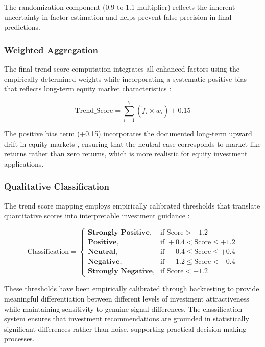 \documentclass[3p,times,procedia]{elsarticle}
\begin{document}
The randomization component (0.9 to 1.1 multiplier) reflects the inherent uncertainty in factor estimation and helps prevent false precision in final predictions.

\subsubsection{{Weighted Aggregation}}

The final trend score computation integrates all enhanced factors using the empirically determined weights while incorporating a systematic positive bias that reflects long-term equity market characteristics \cite{Fama1965}:

\begin{equation}
\text{Trend\_Score} = \sum_{i=1}^{7} \left(\tilde{f}_i \times w_i\right) + 0.15
\end{equation}

The positive bias term (+0.15) incorporates the documented long-term upward drift in equity markets \cite{Fama1965}, ensuring that the neutral case corresponds to market-like returns rather than zero returns, which is more realistic for equity investment applications.

\subsubsection{{Qualitative Classification}}

The trend score mapping employs empirically calibrated thresholds that translate quantitative scores into interpretable investment guidance \cite{Ribeiro2016}:

\begin{equation}
\text{Classification} = 
\begin{cases} 
\textbf{Strongly Positive}, & \text{if Score} > +1.2 \\
\textbf{Positive}, & \text{if } +0.4 < \text{Score} \leq +1.2 \\
\textbf{Neutral}, & \text{if } -0.4 \leq \text{Score} \leq +0.4 \\
\textbf{Negative}, & \text{if } -1.2 \leq \text{Score} < -0.4 \\
\textbf{Strongly Negative}, & \text{if Score} < -1.2
\end{cases}
\end{equation}

These thresholds have been empirically calibrated through backtesting to provide meaningful differentiation between different levels of investment attractiveness while maintaining sensitivity to genuine signal differences. The classification system ensures that investment recommendations are grounded in statistically significant differences rather than noise, supporting practical decision-making processes.
\end{document}
